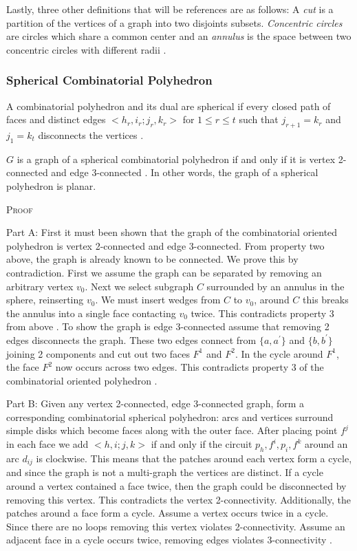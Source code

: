 \documentclass[11pt]{article}
\theoremstyle{definition}
\begin{document}
Lastly, three other definitions that will be references are as follows:
A \emph{cut} is a partition of the vertices of a graph into two disjoints subsets. \emph{Concentric circles} are circles which share a common center and an \emph{annulus} is the space between two concentric circles with different radii \cite{mathworld:ConcentricCircles}.

\subsubsection{Spherical Combinatorial Polyhedron}
A combinatorial polyhedron and its dual are spherical if every closed path of faces and distinct edges $<h_r,i_r;j_r,k_r>$ for $1 \leq r \leq t$ such that $j_{r+1} = k_r$ and $j_1 = k_t$ disconnects the vertices \cite{mccProof}.

$G$ is a graph of a spherical combinatorial polyhedron if and only if it is vertex 2-connected and edge 3-connected \cite{mccProof}. In other words, the graph of a spherical polyhedron is planar.

\textsc{Proof}

Part A: First it must been shown that the graph of the combinatorial oriented polyhedron is vertex 2-connected and edge 3-connected. From property two above, the graph is already known to be connected. We prove this by contradiction. First we assume the graph can be separated by removing an arbitrary vertex $v_0$. Next we select subgraph $C$ surrounded by an annulus in the sphere, reinserting $v_0$. We must insert wedges from $C$ to $v_0$, around $C$ this breaks the annulus into a single face contacting $v_0$ twice. This contradicts property 3 from above \cite{mccProof}.
To show the graph is edge 3-connected assume that removing 2 edges disconnects the graph. These two edges connect from $\{a,a^{'}\}$ and $\{b, b^{'}\}$ joining 2 components and cut out two faces $F^1$ and $F^2$. In the cycle around $F^1$, the face $F^2$ now occurs across two edges. This contradicts property 3 of the combinatorial oriented polyhedron \cite{mccProof}.

Part B:
Given any vertex 2-connected, edge 3-connected graph, form a corresponding combinatorial spherical polyhedron: arcs and vertices surround simple disks which become faces along with the outer face. After placing point $f^j$ in each face we add $<h,i;j,k>$ if and only if the circuit $p_h, f^i,p_i,f^k$ around an arc $d_{ij}$ is clockwise. This means that the patches around each vertex form a cycle, and since the graph is not a multi-graph the vertices are distinct. If a cycle around a vertex contained a face twice, then the graph could be disconnected by removing this vertex. This contradicts the vertex 2-connectivity. Additionally, the patches around a face form a cycle. Assume a vertex occurs twice in a cycle. Since there are no loops removing this vertex violates 2-connectivity. Assume an adjacent face in a cycle occurs twice, removing edges violates 3-connectivity \cite{mccProof}.
\end{document}
